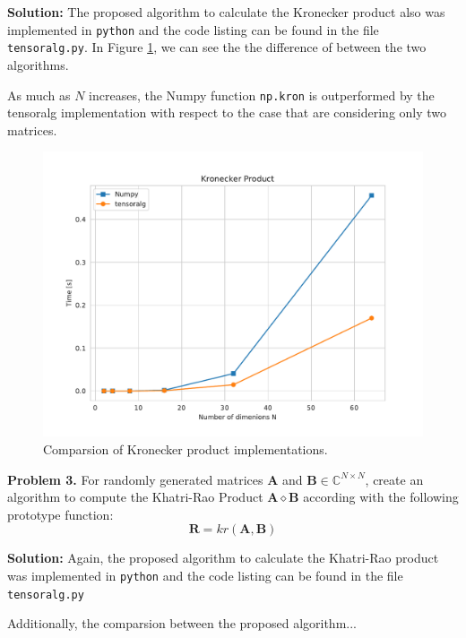 \documentclass[12pt]{article}
\begin{document}
\noindent \textbf{Solution:}
The proposed algorithm to calculate the Kronecker product also was implemented 
in \texttt{python} and the code listing can be found in the file 
\texttt{tensoralg.py}. In Figure \ref{kron}, we can see the the difference of 
between the two algorithms.

As much as $N$ increases, the Numpy function \texttt{np.kron} is outperformed 
by the tensoralg implementation with respect to the case that are considering 
only two matrices.\\

\begin{figure}[!ht]
       \centering 
       \includegraphics[width=0.55\linewidth]{figs/kron.pdf}
       \caption{Comparsion of Kronecker product implementations.}
       \label{kron}
   \end{figure}

\noindent
\textbf{Problem 3.} For randomly generated matrices $\bm{A}$ and $\bm{B}\in 
\mathbb{C}^{N\times N}$, create an algorithm to compute the Khatri-Rao Product 
$\bm{A} \diamond \bm{B}$ according with the following prototype function:
\begin{equation*}
\bm{R} = \mathit{kr}(\bm{A}, \bm{B})    
\end{equation*}

\noindent \textbf{Solution:}
Again, the proposed algorithm to calculate the Khatri-Rao product was 
implemented in \texttt{python} and the code listing can be found in the file 
\texttt{tensoralg.py}

Additionally, the comparsion between the proposed algorithm...
\end{document}
